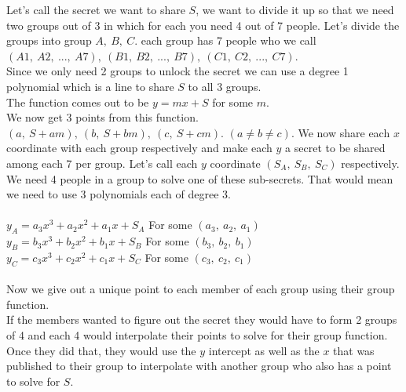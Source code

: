 \documentclass[11pt,letterpaper]{article}
\begin{document}
Let's call the secret we want to share $S$, we want to divide it up so that we need two groups out of 3 in which for each you need 4 out of 7 people. Let's divide the groups into group $A,~B,~C$. each group has 7 people who we call $(A1,~A2,~ ...,~ A7),~(B1,~B2,~ ...,~ B7),~(C1,~C2,~ ...,~ C7)$.\\
Since we only need 2 groups to unlock the secret we can use a degree 1 polynomial which is a line to share $S$ to all 3 groups.\\ The function comes out to be $y=mx + S$ for some $m$. \\We now get 3 points from this function. $(a,~S+am),~(b,~S+bm),~(c,~S+cm).$ $(a\neq b\neq c)$. We now share each  $x$ coordinate with each group respectively and make each $y$ a secret to be shared among each 7 per group.
Let's call each $y$ coordinate $(S_A,~S_B,~S_C)$ respectively. We need 4 people in a group to solve one of these sub-secrets. That would mean we need to use 3 polynomials each of degree 3.\\
\\
$y_A = a_3x^3 + a_2x^2 + a_1x + S_A$ For some $(a_3,~a_2,~a_1)$\\
$y_B = b_3x^3 + b_2x^2 + b_1x + S_B$ For some $(b_3,~b_2,~b_1)$\\
$y_C = c_3x^3 + c_2x^2 + c_1x + S_C$ For some $(c_3,~c_2,~c_1)$\\
\\
Now we give out a unique point to each member of each group using their group function.\\
If the members wanted to figure out the secret they would have to form 2 groups of 4 and each 4 would interpolate their points to solve for their group function. Once they did that, they would use the $y$ intercept as well as the $x$ that was published to their group to interpolate with another group who also has a point to solve for $S$.
\clearpage
\end{document}
